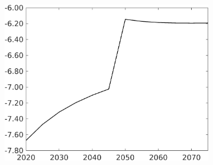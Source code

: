 \begin{figure}[h!!]
\begin{subfigure}{0.7\textwidth}
\begin{minipage}[]{0.45\textwidth}
			\includegraphics[width=1\textwidth]{../../codding_model/own_basedOnFried/optimalPol_010922_revision/figures/all_13Sept22/CompTaufPER_bytaul_Equlab_Reg5_Tauf_spillover0_nsk0_xgr0_knspil0_sep0_LFlimit1_emsbase0_countec0_GovRev0_etaa0.79_lgd0.png} 
		\end{minipage}	
	\end{subfigure}
	

\end{figure}
